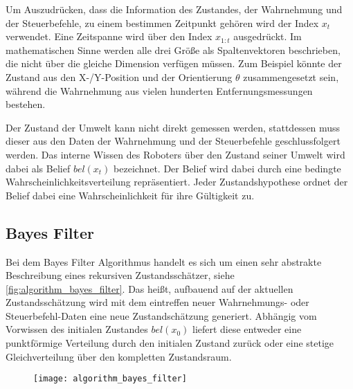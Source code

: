 Um Auszudrücken, dass die Information des Zustandes, der Wahrnehmung und der Steuerbefehle, zu einem bestimmen Zeitpunkt gehören wird der Index $x_t$ verwendet. Eine Zeitspanne wird über den Index $x_{1:t}$ ausgedrückt. Im mathematischen Sinne werden alle drei Größe als Spaltenvektoren beschrieben, die nicht über die gleiche Dimension verfügen müssen. Zum Beispiel könnte der Zustand aus den X-/Y-Position und der Orientierung $\theta$ zusammengesetzt sein, während die Wahrnehmung aus vielen hunderten Entfernungsmessungen bestehen.

Der Zustand der Umwelt kann nicht direkt gemessen werden, stattdessen muss dieser aus den Daten der Wahrnehmung und der Steuerbefehle geschlussfolgert werden. Das interne Wissen des Roboters über den Zustand seiner Umwelt wird dabei als Belief $bel(x_t)$ bezeichnet. Der Belief wird dabei durch eine bedingte Wahrscheinlichkeitsverteilung repräsentiert. Jeder Zustandshypothese ordnet der Belief dabei eine Wahrscheinlichkeit für ihre Gültigkeit zu.


%
%
\subsection{Bayes Filter}

Bei dem Bayes Filter Algorithmus handelt es sich um einen sehr abstrakte Beschreibung eines rekursiven Zustandsschätzer, siehe \autoref{fig:algorithm_bayes_filter}. Das heißt, aufbauend  auf der aktuellen Zustandsschätzung wird mit dem eintreffen neuer Wahrnehmungs- oder Steuerbefehl-Daten eine neue Zustandschätzung generiert. Abhängig vom Vorwissen des initialen Zustandes $bel(x_0)$ liefert diese entweder eine punktförmige Verteilung durch den initialen Zustand zurück oder eine stetige Gleichverteilung über den kompletten Zustandsraum. 

\begin{figure}
	\centering
	\texttt{[image: algorithm\_bayes\_filter]}
	\label{fig:algorithm_bayes_filter}
\end{figure}


